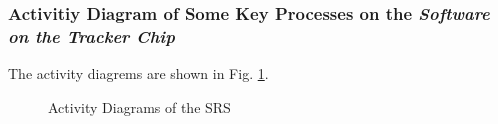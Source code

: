 \documentclass[technote, transmag, onecolumn, 9pt]{IEEEtran}
\begin{document}
\subsubsection*{\textbf{Activitiy Diagram of Some Key Processes on the \textit{Software on the Tracker Chip}}}

The activity diagrems are shown in Fig. \ref{fig:activity-diagram}.

\begin{figure}[!ht]
	\centering
	\hfil
	\hspace{0.2in}
	\caption{Activity Diagrams of the SRS}
	\label{fig:activity-diagram}
\end{figure}
\end{document}
